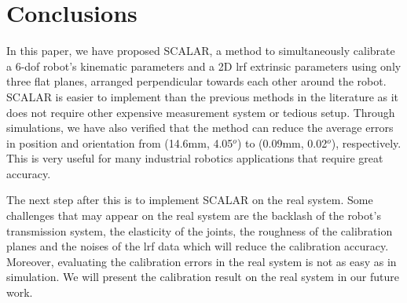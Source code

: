 \section{Conclusions}
\label{sec:conclusions}

In this paper, we have proposed SCALAR, a method to simultaneously calibrate a 6-\ac{dof} robot's kinematic parameters and a 2D \ac{lrf} extrinsic parameters using only three flat planes, arranged perpendicular towards each other around the robot. SCALAR is easier to implement than the previous methods in the literature as it does not require other expensive measurement system or tedious setup. Through simulations, we have also verified that the method can reduce the average errors in position and orientation from (14.6mm, 4.05$^o$) to (0.09mm, 0.02$^o$), respectively. This is very useful for many industrial robotics applications that require great accuracy. 

The next step after this is to implement SCALAR on the real system. Some challenges that may appear on the real system are the backlash of the robot's transmission system, the elasticity of the joints, the roughness of the calibration planes and the noises of the \ac{lrf} data which will reduce the calibration accuracy. Moreover, evaluating the calibration errors in the real system is not as easy as in simulation. We will present the calibration result on the real system in our future work. 